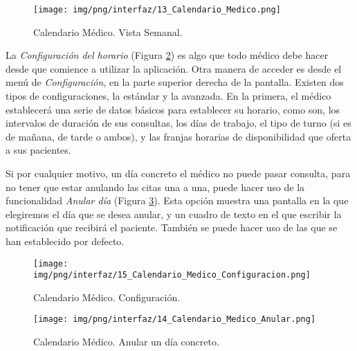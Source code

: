 \documentclass[a4paper,oneside,11pt]{book}
\begin{document}
			
			\begin{figure}[H]
			  \centering
			    \texttt{[image: img/png/interfaz/13\_Calendario\_Medico.png]}
			  \caption{Calendario Médico. Vista Semanal.}
			  \label{fig:iu_calendario_vista_semanal}
			\end{figure}
			
			La \textit{Configuración del horario} (Figura \ref{fig:iu_calendario_configuracion}) es algo que todo médico debe hacer desde que comience a utilizar la aplicación. Otra manera de acceder es desde el menú de \textit{Configuración}, en la parte superior derecha de la pantalla. 
			Existen dos tipos de configuraciones, la estándar y la avanzada. En la primera, el médico establecerá una serie de datos básicos para establecer su horario, como son, los intervalos de duración de sus consultas, los días de trabajo, el tipo de turno (si es de mañana, de tarde o ambos), y las franjas horarias de disponibilidad que oferta a sus pacientes.
			
				
				Si por cualquier motivo, un día concreto el médico no puede pasar consulta, para no tener que estar anulando las citas una a una, puede hacer uso de la funcionalidad \textit{Anular día} (Figura \ref{fig:iu_calendario_anular_dia}). Esta opción muestra una pantalla en la que elegiremos el día que se desea anular, y un cuadro de texto en el que escribir la notificación que recibirá el paciente. También se puede hacer uso de las que se han establecido por defecto.
				
			
			\begin{figure}[H]
			  \centering
			    \texttt{[image: img/png/interfaz/15\_Calendario\_Medico\_Configuracion.png]}
			  \caption{Calendario Médico. Configuración.}
			  \label{fig:iu_calendario_configuracion}
			\end{figure}
			
			\begin{figure}[H]
			  \centering
			    \texttt{[image: img/png/interfaz/14\_Calendario\_Medico\_Anular.png]}
			  \caption{Calendario Médico. Anular un día concreto.}
			  \label{fig:iu_calendario_anular_dia}
			\end{figure}
			
\end{document}
